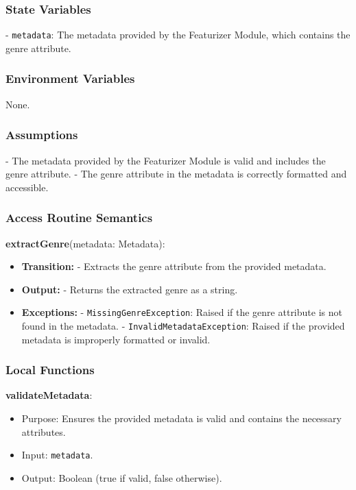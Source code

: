 \documentclass[12pt, titlepage]{article}
\begin{document}
\subsubsection{State Variables}
- \texttt{metadata}: The metadata provided by the Featurizer Module, which contains the genre attribute.

\subsubsection{Environment Variables}
None.

\subsubsection{Assumptions}
- The metadata provided by the Featurizer Module is valid and includes the genre attribute.
- The genre attribute in the metadata is correctly formatted and accessible.

\subsubsection{Access Routine Semantics}

\noindent \textbf{extractGenre}(metadata: Metadata):
\begin{itemize}
\item \textbf{Transition:} 
    - Extracts the genre attribute from the provided metadata.
\item \textbf{Output:} 
    - Returns the extracted genre as a string.
\item \textbf{Exceptions:} 
    - \texttt{MissingGenreException}: Raised if the genre attribute is not found in the metadata.
    - \texttt{InvalidMetadataException}: Raised if the provided metadata is improperly formatted or invalid.
\end{itemize}

\subsubsection{Local Functions}

\textbf{validateMetadata}:
\begin{itemize}
\item Purpose: Ensures the provided metadata is valid and contains the necessary attributes.
\item Input: \texttt{metadata}.
\item Output: Boolean (true if valid, false otherwise).
\end{itemize}
\end{document}
